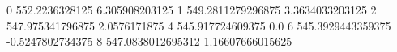 0 552.2236328125 6.305908203125
1 549.2811279296875 3.3634033203125
2 547.975341796875 2.0576171875
4 545.917724609375 0.0
6 545.3929443359375 -0.5247802734375
8 547.0838012695312 1.16607666015625
